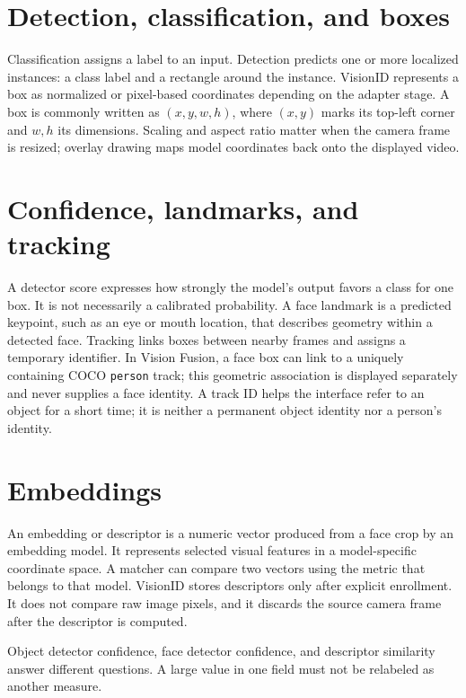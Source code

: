 \documentclass[11pt,oneside,openany]{report}
\begin{document}
\section{Detection, classification, and boxes}
Classification assigns a label to an input. Detection predicts one or more localized instances: a class label and a rectangle around the instance. VisionID represents a box as normalized or pixel-based coordinates depending on the adapter stage. A box is commonly written as \((x,y,w,h)\), where \((x,y)\) marks its top-left corner and \(w,h\) its dimensions. Scaling and aspect ratio matter when the camera frame is resized; overlay drawing maps model coordinates back onto the displayed video.

\section{Confidence, landmarks, and tracking}
A detector score expresses how strongly the model's output favors a class for one box. It is not necessarily a calibrated probability. A face landmark is a predicted keypoint, such as an eye or mouth location, that describes geometry within a detected face. Tracking links boxes between nearby frames and assigns a temporary identifier. In Vision Fusion, a face box can link to a uniquely containing COCO \texttt{person} track; this geometric association is displayed separately and never supplies a face identity. A track ID helps the interface refer to an object for a short time; it is neither a permanent object identity nor a person's identity.

\section{Embeddings}
An embedding or descriptor is a numeric vector produced from a face crop by an embedding model. It represents selected visual features in a model-specific coordinate space. A matcher can compare two vectors using the metric that belongs to that model. VisionID stores descriptors only after explicit enrollment. It does not compare raw image pixels, and it discards the source camera frame after the descriptor is computed.

\begin{principlebox}
Object detector confidence, face detector confidence, and descriptor similarity answer different questions. A large value in one field must not be relabeled as another measure.
\end{principlebox}
\end{document}
